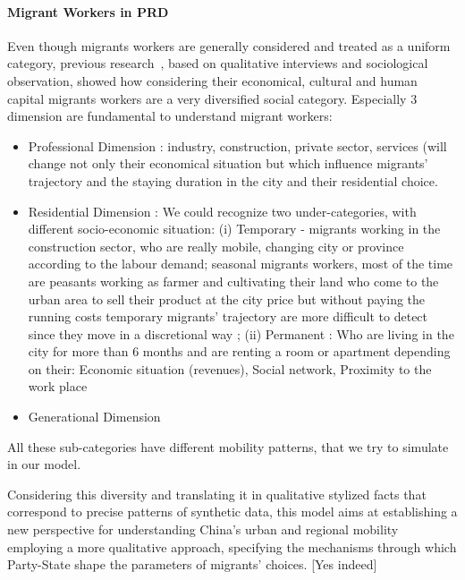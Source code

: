 \paragraph{Migrant Workers in PRD}


Even though migrants workers are generally considered and treated as a uniform category, previous research~\cite{losavio2016analyser}, based on qualitative interviews and sociological observation, showed how considering their economical, cultural and human capital migrants workers are a very diversified social category. Especially 3 dimension are fundamental to understand migrant workers:
\begin{itemize}
\item Professional Dimension : industry, construction, private sector, services (will change not only their economical situation but which influence  migrants’ trajectory and the staying duration in the city and their residential choice.
\item Residential Dimension : We could recognize two under-categories, with different socio-economic situation: (i) Temporary - migrants working in the construction sector, who are really mobile, changing city or province according to the labour demand;  seasonal migrants workers, most of the time are peasants working as farmer and cultivating their land who come to the urban area to sell their product at the city price but without paying the running costs temporary migrants’ trajectory are more difficult to detect since they move in a discretional way ; (ii) Permanent :  Who are living in the city for more than 6 months and are renting a room or apartment depending on their: Economic situation (revenues), Social network, Proximity to the work place
\item Generational Dimension
\end{itemize}


All these sub-categories have different mobility patterns, that we try to simulate in our model.

Considering this diversity and translating it in qualitative stylized facts that correspond to precise patterns of synthetic data, this model aims at establishing a new perspective for understanding China’s urban and regional mobility employing a more qualitative approach, specifying the mechanisms through which Party-State shape the parameters of migrants’ choices. [Yes indeed]





